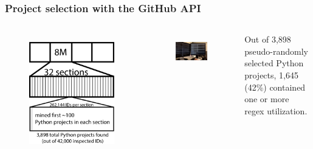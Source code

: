 \begin{frame}
\frametitle{Project selection with the GitHub API}
\begin{columns}[t]
\begin{figure}[ht]
  \includegraphics[scale=0.16]{../nontex/illustrations/32Divided.pdf}
  \label{fig:32Divided}
\end{figure}
\begin{figure}[ht]
  \includegraphics[width=\linewidth]{../nontex/smallScrapersPNG/smallScrapers-112}
    \label{fig:scraper}
\end{figure}
Out of 3,898 pseudo-randomly selected Python projects, 1,645 (42\%) contained one or more regex utilization.
\end{columns}
\end{frame}

